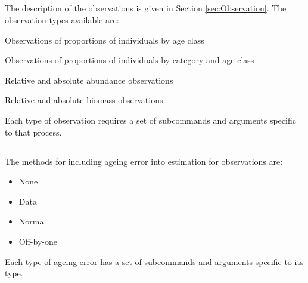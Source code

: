 \subsection{}\label{syntax:ObservationTypes}

The description of the observations is given in Section \ref{sec:Observation}. The observation types available are:

\begin{description}
  \item Observations of proportions of individuals by age class
  \item Observations of proportions of individuals by category and age class
  \item Relative and absolute abundance observations
  \item Relative and absolute biomass observations
\end{description}

Each type of observation requires a set of subcommands and arguments specific to that process.



\subsection{}


\subsection{}\label{syntax:AgeingError}

The methods for including ageing error into estimation for observations are:

\begin{itemize}
	\item None
	\item Data
	\item Normal
	\item Off-by-one
\end{itemize}

Each type of ageing error has a set of subcommands and arguments specific to its type.



\subsection{}


